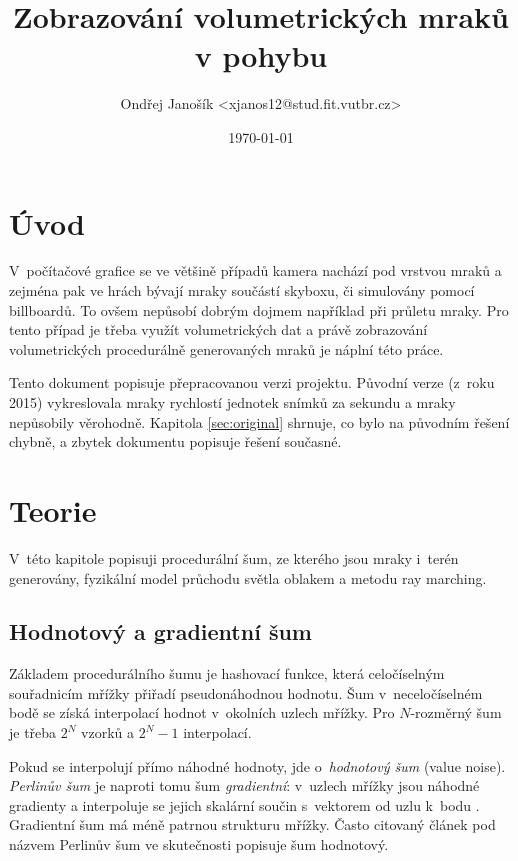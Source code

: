 \documentclass[a4paper, 12pt]{article}
\title{Zobrazování volumetrických mraků v pohybu}
\author{Ondřej Janošík <xjanos12@stud.fit.vutbr.cz>}
\date{\today}
\begin{document}
\maketitle

\section{Úvod}

V~počítačové grafice se ve většině případů kamera nachází pod vrstvou mraků
a zejména pak ve hrách bývají mraky součástí skyboxu,
či simulovány pomocí billboardů. To ovšem nepůsobí dobrým dojmem například
při průletu mraky. Pro tento případ je třeba využít volumetrických dat a právě
zobrazování volumetrických procedurálně generovaných mraků je náplní této práce.

Tento dokument popisuje přepracovanou verzi projektu. Původní verze
(z~roku 2015) vykreslovala mraky rychlostí jednotek snímků za sekundu a mraky
nepůsobily věrohodně. Kapitola \ref{sec:original} shrnuje, co bylo na původním
řešení chybně, a zbytek dokumentu popisuje řešení současné.


\section{Teorie}

V~této kapitole popisuji procedurální šum, ze kterého jsou mraky i~terén
generovány, fyzikální model průchodu světla oblakem a metodu ray marching.

\subsection{Hodnotový a gradientní šum}

Základem procedurálního šumu je hashovací funkce, která celočíselným souřadnicím
mřížky přiřadí pseudonáhodnou hodnotu. Šum v~neceločíselném bodě se získá
interpolací hodnot v~okolních uzlech mřížky. Pro $N$-rozměrný šum je třeba
$2^N$ vzorků a $2^N - 1$ interpolací.

Pokud se interpolují přímo náhodné hodnoty, jde o~\textit{hodnotový šum}
(value noise). \textit{Perlinův šum} je naproti tomu šum
\textit{gradientní}: v~uzlech mřížky jsou náhodné gradienty a interpoluje se
jejich skalární součin s~vektorem od uzlu k~bodu \cite{perlin2002}. Gradientní
šum má méně patrnou strukturu mřížky. Často citovaný článek
\cite{url:elias-perlin-noise} pod názvem Perlinův šum ve skutečnosti popisuje
šum hodnotový.
\end{document}
